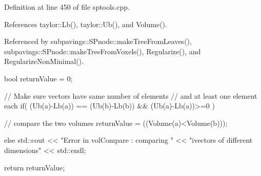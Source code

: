 \-Definition at line 450 of file sptools.\-cpp.



\-References taylor\-::\-Lb(), taylor\-::\-Ub(), and \-Volume().



\-Referenced by subpavings\-::\-S\-Pnode\-::make\-Tree\-From\-Leaves(), subpavings\-::\-S\-Pnode\-::make\-Tree\-From\-Voxels(), \-Regularize(), and \-Regularize\-Non\-Minimal().


\begin{DoxyCode}
    {
        bool returnValue = 0;

        // Make sure vectors have same number of elements
        // and at least one element each
        if( (Ub(a)-Lb(a)) == (Ub(b)-Lb(b)) && (Ub(a)-Lb(a))>=0 ) {
            // compare the two volumes
            returnValue = ((Volume(a)<Volume(b)));

        }
        else {
            std::cout << "Error in volCompare : comparing "
                << "ivectors of different dimensions"
                << std::endl;
        }

        return returnValue;
    }
\end{DoxyCode}
